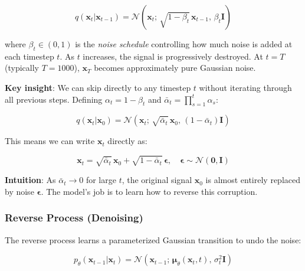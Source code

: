 \documentclass[conference]{IEEEtran}
\begin{document}
\begin{equation}
    q(\mathbf{x}_t | \mathbf{x}_{t-1}) = \mathcal{N}\left(\mathbf{x}_t;\, \sqrt{1 - \beta_t}\,\mathbf{x}_{t-1},\, \beta_t \mathbf{I}\right)
    \label{eq:forward_step}
\end{equation}

where $\beta_t \in (0, 1)$ is the \textit{noise schedule} controlling how much noise is added at each timestep $t$. As $t$ increases, the signal is progressively destroyed. At $t = T$ (typically $T = 1000$), $\mathbf{x}_T$ becomes approximately pure Gaussian noise.

\textbf{Key insight}: We can skip directly to any timestep $t$ without iterating through all previous steps. Defining $\alpha_t = 1 - \beta_t$ and $\bar{\alpha}_t = \prod_{s=1}^{t} \alpha_s$:

\begin{equation}
    q(\mathbf{x}_t | \mathbf{x}_0) = \mathcal{N}\left(\mathbf{x}_t;\, \sqrt{\bar{\alpha}_t}\,\mathbf{x}_0,\, (1 - \bar{\alpha}_t)\mathbf{I}\right)
    \label{eq:forward_closed}
\end{equation}

This means we can write $\mathbf{x}_t$ directly as:

\begin{equation}
    \mathbf{x}_t = \sqrt{\bar{\alpha}_t}\,\mathbf{x}_0 + \sqrt{1 - \bar{\alpha}_t}\,\boldsymbol{\epsilon}, \quad \boldsymbol{\epsilon} \sim \mathcal{N}(\mathbf{0}, \mathbf{I})
    \label{eq:reparameterization}
\end{equation}

\textbf{Intuition}: As $\bar{\alpha}_t \to 0$ for large $t$, the original signal $\mathbf{x}_0$ is almost entirely replaced by noise $\boldsymbol{\epsilon}$. The model's job is to learn how to reverse this corruption.

\subsubsection{Reverse Process (Denoising)}

The reverse process learns a parameterized Gaussian transition to undo the noise:

\begin{equation}
    p_\theta(\mathbf{x}_{t-1} | \mathbf{x}_t) = \mathcal{N}\left(\mathbf{x}_{t-1};\, \boldsymbol{\mu}_\theta(\mathbf{x}_t, t),\, \sigma_t^2 \mathbf{I}\right)
    \label{eq:reverse}
\end{equation}
\end{document}
